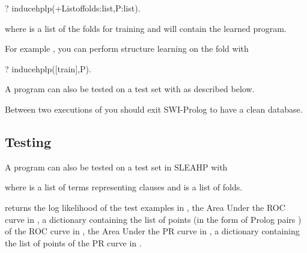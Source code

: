 \documentclass[letterpaper,10pt,english]{sphinxmanual}
\begin{document}
%
\begin{sphinxVerbatim}[commandchars=\\\{\}]
?\PYGZhy{} induce\PYGZus{}hplp(+List\PYGZus{}of\PYGZus{}folds:list,\PYGZhy{}P:list).
\end{sphinxVerbatim}

where  is a list of the folds for training and  will contain the learned program.

For example , you can perform structure learning on the  fold with

%
\begin{sphinxVerbatim}[commandchars=\\\{\}]
?\PYGZhy{} induce\PYGZus{}hplp([train],P).
\end{sphinxVerbatim}

A program can also be tested on a test set with   as described below.

Between two executions of  you should exit SWI-Prolog to have a clean database.


\subsection{Testing}
\label{\detokenize{index:testing}}
A program can also be tested on a test set in SLEAHP with

%
\begin{sphinxVerbatim}[commandchars=\\\{\}]
  
\end{sphinxVerbatim}

where  is a list of terms representing clauses and  is a list of folds.

 returns the log likelihood of the test examples in , the Area Under the ROC curve in , a dictionary containing the list of points (in the form of Prolog pairs ) of the ROC curve in , the Area Under the PR curve in , a dictionary containing the list of points of the PR curve in .
\end{document}
